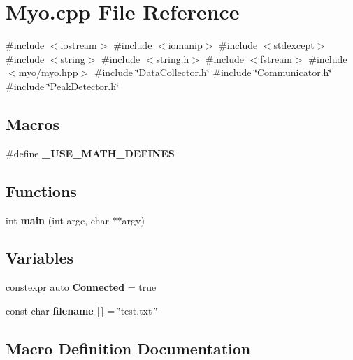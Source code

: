 \section{Myo.\+cpp File Reference}
\label{_myo_8cpp}
{\ttfamily \#include $<$iostream$>$}\newline
{\ttfamily \#include $<$iomanip$>$}\newline
{\ttfamily \#include $<$stdexcept$>$}\newline
{\ttfamily \#include $<$string$>$}\newline
{\ttfamily \#include $<$string.\+h$>$}\newline
{\ttfamily \#include $<$fstream$>$}\newline
{\ttfamily \#include $<$myo/myo.\+hpp$>$}\newline
{\ttfamily \#include \char`\"{}Data\+Collector.\+h\char`\"{}}\newline
{\ttfamily \#include \char`\"{}Communicator.\+h\char`\"{}}\newline
{\ttfamily \#include \char`\"{}Peak\+Detector.\+h\char`\"{}}\newline
\subsection*{Macros}
\begin{DoxyCompactItemize}
\item 
\#define \textbf{ \+\_\+\+U\+S\+E\+\_\+\+M\+A\+T\+H\+\_\+\+D\+E\+F\+I\+N\+ES}
\end{DoxyCompactItemize}
\subsection*{Functions}
\begin{DoxyCompactItemize}
\item 
int \textbf{ main} (int argc, char $\ast$$\ast$argv)
\end{DoxyCompactItemize}
\subsection*{Variables}
\begin{DoxyCompactItemize}
\item 
constexpr auto \textbf{ Connected} = true
\item 
const char \textbf{ filename} [$\,$] = \char`\"{}test.\+txt \char`\"{}
\end{DoxyCompactItemize}


\subsection{Macro Definition Documentation}
\mbox{\label{_myo_8cpp_a525335710b53cb064ca56b936120431e}} 
